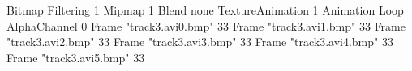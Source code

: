 {Bitmap
	{Filtering 1}
	{Mipmap 1}
	{Blend none}
	{TextureAnimation 1}
	{Animation Loop}
	{AlphaChannel 0}
	{Frame "track3.avi0.bmp"	33}
	{Frame "track3.avi1.bmp"	33}
	{Frame "track3.avi2.bmp"	33}
	{Frame "track3.avi3.bmp"	33}
	{Frame "track3.avi4.bmp"	33}
	{Frame "track3.avi5.bmp"	33}
}
